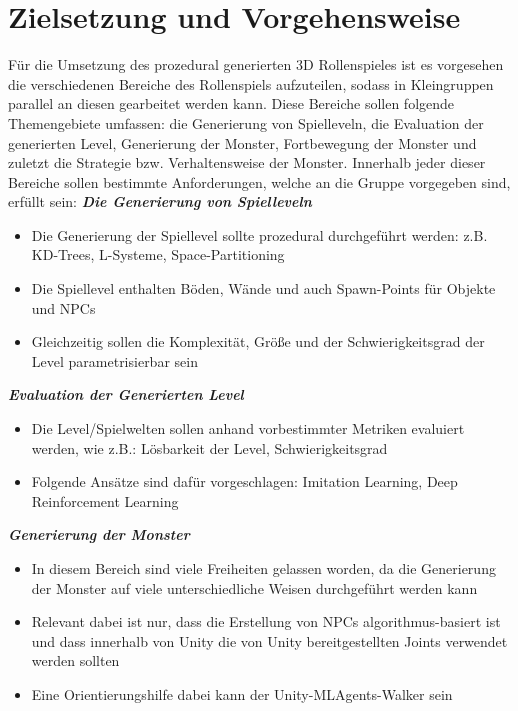 \section{Zielsetzung und Vorgehensweise}

Für die Umsetzung des prozedural generierten 3D Rollenspieles ist es vorgesehen die verschiedenen Bereiche des Rollenspiels aufzuteilen, sodass in Kleingruppen parallel an diesen gearbeitet werden kann. Diese Bereiche sollen folgende Themengebiete umfassen: die Generierung von Spielleveln, die Evaluation der generierten Level, Generierung der Monster, Fortbewegung der Monster und zuletzt die Strategie bzw. Verhaltensweise der Monster. Innerhalb jeder dieser Bereiche sollen bestimmte Anforderungen, welche an die Gruppe vorgegeben sind, erfüllt sein: \newline \newline
\textbf{\textit{Die Generierung von Spielleveln}}\newline
\begin{itemize}
	\item Die Generierung der Spiellevel sollte prozedural durchgeführt werden: z.B. KD-Trees, L-Systeme, Space-Partitioning
	\item Die Spiellevel enthalten Böden, Wände und auch Spawn-Points für Objekte und NPCs
	\item Gleichzeitig sollen die Komplexität, Größe und der Schwierigkeitsgrad der Level parametrisierbar sein
\end{itemize}
\textbf{\textit{Evaluation der Generierten Level}}
\begin{itemize}
	\item Die Level/Spielwelten sollen anhand vorbestimmter Metriken evaluiert werden, wie z.B.: Lösbarkeit der Level, Schwierigkeitsgrad
	\item Folgende Ansätze sind dafür vorgeschlagen: Imitation Learning, Deep Reinforcement Learning
\end{itemize}
\textbf{\textit{Generierung der Monster}}
\begin{itemize}
	\item In diesem Bereich sind viele Freiheiten gelassen worden, da die Generierung der Monster auf viele unterschiedliche Weisen durchgeführt werden kann
	\item Relevant dabei ist nur, dass die Erstellung von NPCs algorithmus-basiert ist und dass innerhalb von Unity die von Unity bereitgestellten Joints verwendet werden sollten
	\item Eine Orientierungshilfe dabei kann der Unity-MLAgents-Walker sein
\end{itemize}
